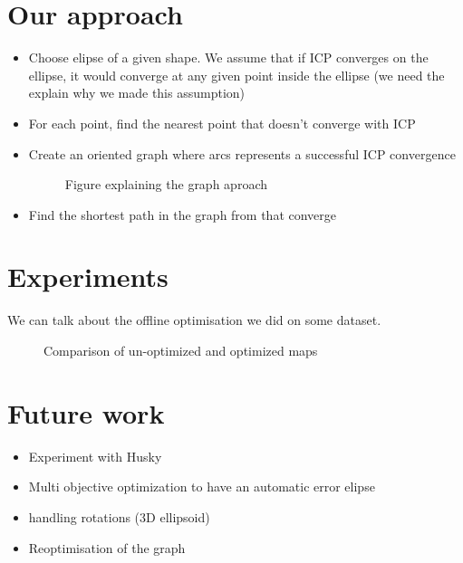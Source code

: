 \documentclass[letterpaper,10 pt,conference]{ieeeconf}
\begin{document}
\section{Our approach}
\begin{itemize}
  \item Choose elipse of a given shape. We assume that if ICP converges on the
    ellipse, it would converge at any given point inside the ellipse (we need the explain why we made this assumption)

  \item For each point, find the nearest point that doesn't converge with ICP

  \item Create an oriented graph where arcs represents a successful ICP convergence
    \begin{figure}
      \caption{Figure explaining the graph aproach}
    \end{figure}

  \item Find the shortest path in the graph from that converge

\end{itemize}


\section{Experiments}
We can talk about the offline optimisation we did on some dataset.

\begin{figure}
  \caption{Comparison of un-optimized and optimized maps}
\end{figure}


\section{Future work}

\begin{itemize}
  \item Experiment with Husky

  \item Multi objective optimization to have an automatic error elipse

  \item handling rotations (3D ellipsoid)

  \item Reoptimisation of the graph

\end{itemize}
\end{document}
